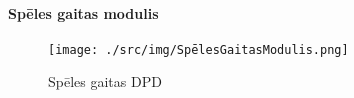 \paragraph{Spēles gaitas modulis}

\begin{figure}[htbp]
	\centering
	\texttt{[image: ./src/img/SpēlesGaitasModulis.png]}
	\caption{Spēles gaitas DPD}
	\label{fig:dpd-2-game-progress}
\end{figure}





